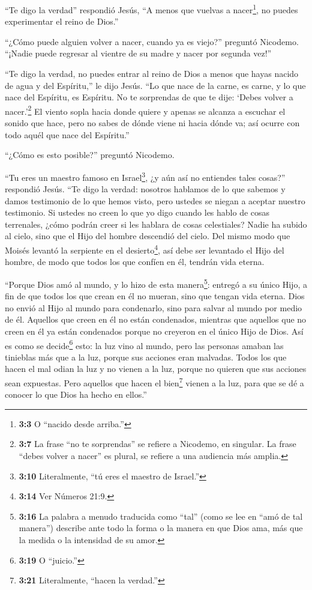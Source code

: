  ``Te digo la verdad'' respondió Jesús, ``A menos que
vuelvas a nacer\footnote{\textbf{3:3} O ``nacido desde arriba.''}, no
puedes experimentar el reino de Dios.''

 ``¿Cómo puede alguien volver a nacer, cuando ya es viejo?''
preguntó Nicodemo. ``¡Nadie puede regresar al vientre de su madre y
nacer por segunda vez!''

 ``Te digo la verdad, no puedes entrar al reino de Dios a
menos que hayas nacido de agua y del Espíritu,'' le dijo Jesús.
 ``Lo que nace de la carne, es carne, y lo que nace del
Espíritu, es Espíritu.  No te sorprendas de que te dije:
`Debes volver a nacer.'\footnote{\textbf{3:7} La frase ``no te
  sorprendas'' se refiere a Nicodemo, en singular. La frase ``debes
  volver a nacer'' es plural, se refiere a una audiencia más amplia.}
 El viento sopla hacia donde quiere y apenas se alcanza a
escuchar el sonido que hace, pero no sabes de dónde viene ni hacia dónde
va; así ocurre con todo aquél que nace del Espíritu.''

 ``¿Cómo es esto posible?'' preguntó Nicodemo.

 ``Tu eres un maestro famoso en Israel\footnote{\textbf{3:10}
  Literalmente, ``tú eres el maestro de Israel.''}, ¿y aún así no
entiendes tales cosas?'' respondió Jesús.  ``Te digo la
verdad: nosotros hablamos de lo que sabemos y damos testimonio de lo que
hemos visto, pero ustedes se niegan a aceptar nuestro testimonio.
 Si ustedes no creen lo que yo digo cuando les hablo de
cosas terrenales, ¿cómo podrán creer si les hablara de cosas
celestiales?  Nadie ha subido al cielo, sino que el Hijo
del hombre descendió del cielo.  Del mismo modo que Moisés
levantó la serpiente en el desierto\footnote{\textbf{3:14} Ver Números
  21:9.}, así debe ser levantado el Hijo del hombre,  de
modo que todos los que confíen en él, tendrán vida eterna.

 ``Porque Dios amó al mundo, y lo hizo de esta
manera\footnote{\textbf{3:16} La palabra a menudo traducida como ``tal''
  (como se lee en ``amó de tal manera'') describe ante todo la forma o
  la manera en que Dios ama, más que la medida o la intensidad de su
  amor.}: entregó a su único Hijo, a fin de que todos los que crean en
él no mueran, sino que tengan vida eterna.  Dios no envió
al Hijo al mundo para condenarlo, sino para salvar al mundo por medio de
él.  Aquellos que creen en él no están condenados, mientras
que aquellos que no creen en él ya están condenados porque no creyeron
en el único Hijo de Dios.  Así es como se decide\footnote{\textbf{3:19}
  O ``juicio.''} esto: la luz vino al mundo, pero las personas amaban
las tinieblas más que a la luz, porque sus acciones eran malvadas.
 Todos los que hacen el mal odian la luz y no vienen a la
luz, porque no quieren que sus acciones sean expuestas. 
Pero aquellos que hacen el bien\footnote{\textbf{3:21} Literalmente,
  ``hacen la verdad.''} vienen a la luz, para que se dé a conocer lo que
Dios ha hecho en ellos.''

